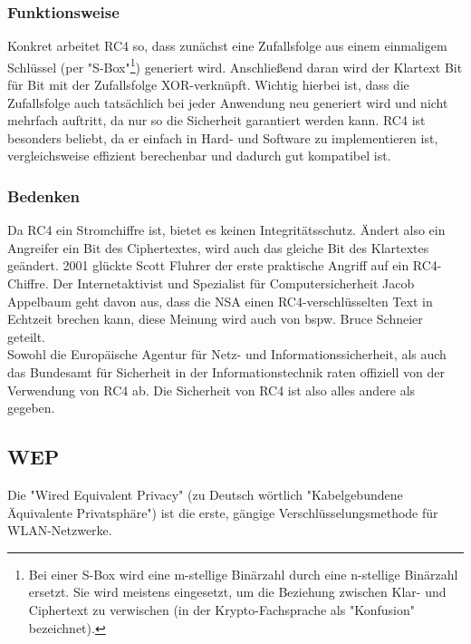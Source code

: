 \documentclass[a4paper,13pt]{scrartcl}
\begin{document}
\subsubsection{Funktionsweise}
Konkret arbeitet RC4 so, dass zunächst eine Zufallsfolge aus einem einmaligem Schlüssel (per "S-Box"\footnote{Bei einer S-Box wird eine m-stellige Binärzahl durch eine n-stellige Binärzahl ersetzt. Sie wird meistens eingesetzt, um die Beziehung zwischen Klar- und Ciphertext zu verwischen (in der Krypto-Fachsprache als "Konfusion" bezeichnet).}) generiert wird. Anschließend daran wird der Klartext Bit für Bit mit der Zufallsfolge XOR-verknüpft. Wichtig hierbei ist, dass die Zufallsfolge auch tatsächlich bei jeder Anwendung neu generiert wird und nicht mehrfach auftritt, da nur so die Sicherheit garantiert werden kann. RC4 ist besonders beliebt, da er einfach in Hard- und Software zu implementieren ist, vergleichsweise effizient berechenbar und dadurch gut kompatibel ist.
\subsubsection{Bedenken}
Da RC4 ein Stromchiffre ist, bietet es keinen Integritätsschutz. Ändert also ein Angreifer ein Bit des Ciphertextes, wird auch das gleiche Bit des Klartextes geändert. 2001 glückte Scott Fluhrer der erste praktische Angriff auf ein RC4-Chiffre. Der Internetaktivist und Spezialist für Computersicherheit Jacob Appelbaum geht davon aus, dass die NSA einen RC4-verschlüsselten Text in Echtzeit brechen kann, diese Meinung wird auch von bspw. Bruce Schneier geteilt.\\
Sowohl die Europäische Agentur für Netz- und Informationssicherheit, als auch das Bundesamt für Sicherheit in der Informationstechnik raten offiziell von der Verwendung von RC4 ab. Die Sicherheit von RC4 ist also alles andere als gegeben.
\subsection{WEP}
Die "Wired Equivalent Privacy" (zu Deutsch wörtlich "Kabelgebundene Äquivalente Privatsphäre") ist die erste, gängige Verschlüsselungsmethode für WLAN-Netzwerke.
\end{document}
